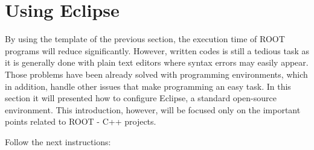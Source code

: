 \documentclass[12pt, oneside]{book}              %
\begin{document}
\section{Using Eclipse}\label{sec:Eclipse}

By using the template of the previous section, the execution time of ROOT programs
will reduce significantly. However, written codes is still a tedious task as
it is generally done with plain text editors where syntax errors may easily appear.
Those problems have been already solved with programming environments, which
in addition, handle other issues that make programming an easy task. In this 
section it will presented how to configure Eclipse, a standard open-source environment.
This introduction, however, will be focused only on the important points related to
ROOT - C++ projects.

Follow the next instructions:
\end{document}
